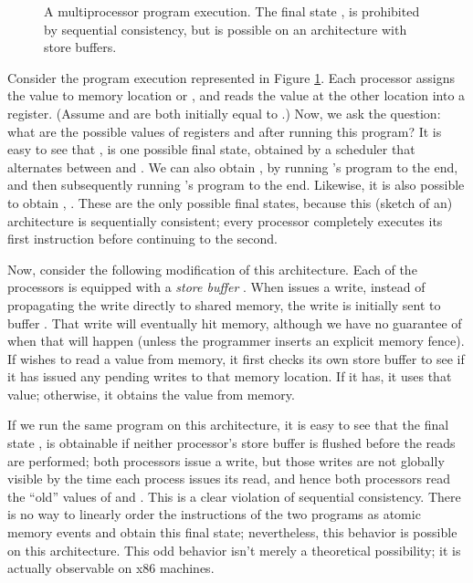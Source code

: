 \documentclass[]{eptcs}
\begin{document}
\begin{figure}[t]

\caption{A multiprocessor program execution. The final state ,  is prohibited by sequential consistency, but is possible on an architecture with store buffers.}
\label{sb}
\end{figure}

Consider the program execution represented in Figure \ref{sb}. Each processor assigns the value  to memory location  or , and reads the value at the other location into a register. (Assume  and  are both initially equal to .) Now, we ask the question: what are the possible values of registers  and  after running this program? It is easy to see that ,  is one possible final state, obtained by a scheduler that alternates between  and . We can also obtain ,  by running 's program to the end, and then subsequently running 's program to the end. Likewise, it is also possible to obtain , . These are the only possible final states, because this (sketch of an) architecture is sequentially consistent; every processor completely executes its first instruction before continuing to the second.

Now, consider the following modification of this architecture. Each of the processors  is equipped with a \emph{store buffer} . When  issues a write, instead of propagating the write directly to shared memory, the write is initially sent to buffer . That write will eventually hit memory, although we have no guarantee of when that will happen (unless the programmer inserts an explicit memory fence). If  wishes to read a value from memory, it first checks its own store buffer to see if it has issued any pending writes to that memory location. If it has, it uses that value; otherwise, it obtains the value from memory. 

If we run the same program on this architecture, it is easy to see that the final state ,  is obtainable if neither processor's store buffer is flushed before the reads are performed; both processors issue a write, but those writes are not globally visible by the time each process issues its read, and hence both processors read the ``old'' values of  and . This is a clear violation of sequential consistency. There is no way to linearly order the instructions of the two programs as atomic memory events and obtain this final state; nevertheless, this behavior is possible on this architecture. This odd behavior isn't merely a theoretical possibility; it is actually observable on x86 machines.
\end{document}
